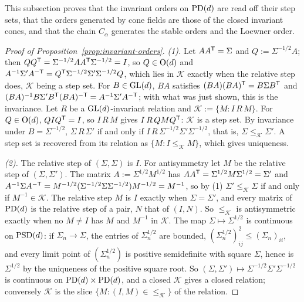 This subsection proves that the invariant orders on $\mathrm{PD}(d)$ are read off their step sets, that the
orders generated by cone fields are those of the closed invariant cones, and that the chain $C_\alpha$
generates the stable orders and the Loewner order.

\begin{proof}[Proof of Proposition~\ref{prop:invariant-orders}]
\emph{(1).} Let $AA^{\mathsf{T}} = \Sigma$ and $Q := \Sigma^{-1/2}A$; then $QQ^{\mathsf{T}} =
\Sigma^{-1/2}AA^{\mathsf{T}}\Sigma^{-1/2} = I$, so $Q \in \mathrm{O}(d)$ and $A^{-1}\Sigma'A^{-\mathsf{T}} =
Q^{\mathsf{T}}\Sigma^{-1/2}\Sigma'\Sigma^{-1/2}Q$, which lies in $\mathcal K$ exactly when the relative step does,
$\mathcal K$ being a step set. For $B \in \mathrm{GL}(d)$, $BA$ satisfies $(BA)(BA)^{\mathsf{T}} = B\Sigma B^{\mathsf{T}}$ and
$(BA)^{-1}B\Sigma'B^{\mathsf{T}}(BA)^{-\mathsf{T}} = A^{-1}\Sigma'A^{-\mathsf{T}}$; with what was just shown, this is the
invariance. Let $R$ be a $\mathrm{GL}(d)$-invariant relation and $\mathcal K := \{M : I \,R\,M\}$. For
$Q \in \mathrm{O}(d)$, $QIQ^{\mathsf{T}} = I$, so $I \,R\,M$ gives $I \,R\,QMQ^{\mathsf{T}}$: $\mathcal K$ is a
step set. By invariance under $B = \Sigma^{-1/2}$, $\Sigma \,R\,\Sigma'$ if and only if
$I \,R\,\Sigma^{-1/2}\Sigma'\Sigma^{-1/2}$, that is, $\Sigma \le_{\mathcal K} \Sigma'$. A step set
is recovered from its relation as $\{M : I \le_{\mathcal K} M\}$, which gives uniqueness.

\emph{(2).} The relative step of $(\Sigma, \Sigma)$ is $I$. For antisymmetry let $M$ be the relative step
of $(\Sigma, \Sigma')$. The matrix $A := \Sigma^{1/2}M^{1/2}$ has $AA^{\mathsf{T}} = \Sigma^{1/2}M\Sigma^{1/2} =
\Sigma'$ and $A^{-1}\Sigma A^{-\mathsf{T}} = M^{-1/2}(\Sigma^{-1/2}\Sigma\Sigma^{-1/2})M^{-1/2} = M^{-1}$, so by
(1) $\Sigma' \le_{\mathcal K} \Sigma$ if and only if $M^{-1} \in \mathcal K$. The
relative step $M$ is $I$ exactly when $\Sigma = \Sigma'$, and every matrix of $\mathrm{PD}(d)$ is the relative step
of a pair, $N$ that of $(I, N)$. So $\le_{\mathcal K}$ is antisymmetric exactly when no $M \ne I$ has $M$
and $M^{-1}$ in $\mathcal K$. The map $\Sigma \mapsto \Sigma^{1/2}$ is continuous on $\mathrm{PSD}(d)$: if
$\Sigma_n \to \Sigma$, the entries of $\Sigma_n^{1/2}$ are bounded, $(\Sigma_n^{1/2})_{ij}^2 \le
(\Sigma_n)_{ii}$, and every limit point of $(\Sigma_n^{1/2})$ is positive semidefinite with square
$\Sigma$, hence is $\Sigma^{1/2}$ by the uniqueness of the positive square root. So
$(\Sigma, \Sigma') \mapsto \Sigma^{-1/2}\Sigma'\Sigma^{-1/2}$ is continuous on $\mathrm{PD}(d) \times \mathrm{PD}(d)$, and a closed
$\mathcal K$ gives a closed relation; conversely $\mathcal K$ is the slice $\{M : (I, M) \in {\le_{\mathcal K}}\}$
of the relation.


\end{proof}
